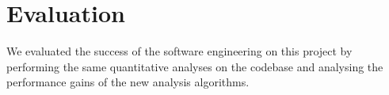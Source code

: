 \section{Evaluation}
We evaluated the success of the software engineering on this project by performing the same quantitative analyses on the codebase and analysing the performance gains of the new analysis algorithms.



